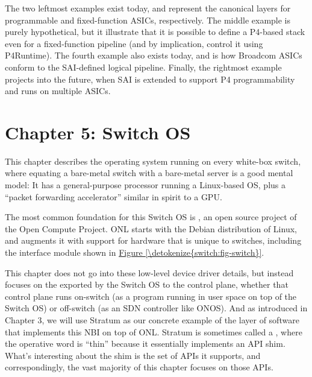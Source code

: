\documentclass[letterpaper,11pt,english]{sphinxmanual}
\begin{document}
The two leftmost examples exist today, and represent the canonical
layers for programmable and fixed-function ASICs, respectively. The
middle example is purely hypothetical, but it illustrate that it is
possible to define a P4-based stack even for a fixed-function pipeline
(and by implication, control it using P4Runtime). The fourth example
also exists today, and is how Broadcom ASICs conform to the
SAI-defined logical pipeline. Finally, the rightmost example projects
into the future, when SAI is extended to support P4 programmability
and runs on multiple ASICs.


\chapter{Chapter 5:  Switch OS}
\label{\detokenize{stratum:chapter-5-switch-os}}\label{\detokenize{stratum::doc}}
This chapter describes the operating system running on every white-box
switch, where equating a bare-metal switch with a bare-metal server is
a good mental model: It has a general-purpose processor running a
Linux-based OS, plus a “packet forwarding accelerator” similar in
spirit to a GPU.

The most common foundation for this Switch OS is , an open source project of the Open Compute Project. ONL starts
with the Debian distribution of Linux, and augments it with support
for hardware that is unique to switches, including the  interface module shown in \hyperref[\detokenize{switch:fig-switch}]{Figure
\ref{\detokenize{switch:fig-switch}}}.

This chapter does not go into these low-level device driver details,
but instead focuses on the  exported by
the Switch OS to the control plane, whether that control plane runs
on-switch (as a program running in user space on top of the Switch OS)
or off-switch (as an SDN controller like ONOS). And as introduced in
Chapter 3, we will use Stratum as our concrete example of the layer of
software that implements this NBI on top of ONL. Stratum is sometimes
called a , where the operative word is “thin” because
it essentially implements an API shim. What’s interesting about the
shim is the set of APIs it supports, and correspondingly, the vast
majority of this chapter focuses on those APIs.
\end{document}
